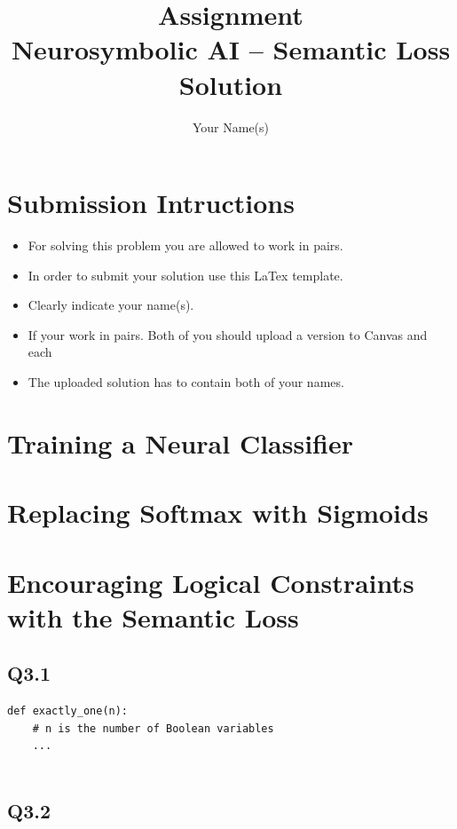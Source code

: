 \documentclass{article}
\title{Assignment\\Neurosymbolic AI -- Semantic Loss\\Solution}
\author{Your Name(s)}
\date{}
\begin{document}
\maketitle




\section*{Submission Intructions}
\begin{itemize}
	\item For solving this problem you are allowed to work in pairs.
	\item In order to submit your solution use this LaTex template.
	\item Clearly indicate your name(s).
	\item If your work in pairs. Both of you should upload a version to Canvas and each
	\item The uploaded solution has to contain both of your names.
\end{itemize}



\section{Training a Neural Classifier}



\section{Replacing Softmax with Sigmoids}




\section{Encouraging Logical Constraints with the Semantic Loss}

\subsection*{Q3.1}

\begin{verbatim}
def exactly_one(n):
	# n is the number of Boolean variables
	...


\end{verbatim}


\subsection*{Q3.2}
\end{document}
